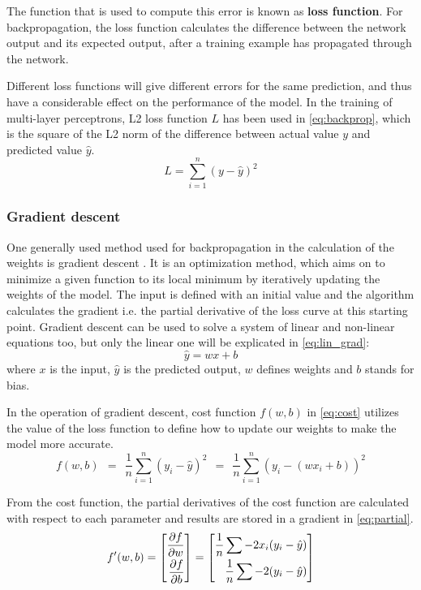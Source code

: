 The function that is used to compute this error is known as \textbf{loss function}. For backpropagation, the loss function calculates the difference between the network output and its expected output, after a training example has propagated through the network. \medskip

Different loss functions will give different errors for the same prediction, and thus have a considerable effect on the performance of the model. In the training of multi-layer perceptrons, L2 loss function $L$ has been used in \eqref{eq:backprop}, which is the square of the L2 norm of the difference between actual value $y$ and predicted value $\hat{y}$.
\begin{equation} L = \sum^n_{i=1}(y - \hat{y})^2 \label{eq:backprop} \end{equation}



\subsubsection{Gradient descent}

One generally used method used for backpropagation in the calculation of the weights is gradient descent \cite{anderson1995introduction}. It is an optimization method, which aims on to minimize a given function to its local minimum by iteratively updating the weights of the model. The input is defined with an initial value and the algorithm calculates the gradient i.e. the partial derivative of the loss curve at this starting point. Gradient descent can be used to solve a system of linear and non-linear equations too, but only the linear one will be explicated in \eqref{eq:lin_grad}:
\begin{equation} \hat{y} = wx + b \label{eq:lin_grad} \end{equation}
where $x$ is the input, $\hat{y}$ is the predicted output, $w$ defines weights and $b$ stands for bias.\medskip

In the operation of gradient descent, cost function $f(w,b)$ in \eqref{eq:cost} utilizes the value of the loss function to define how to update our weights to make the model more accurate.
\begin{equation} f(w,b) ~~=~~ \frac{1}{n} \sum_{i=1}^n(y_i-\hat{y})^2 ~~=~~ \frac{1}{n} \sum_{i=1}^n(y_i-(wx_i+b))^2 \label{eq:cost} \end{equation}

From the cost function, the partial derivatives of the cost function are calculated with respect to each parameter and results are stored in a gradient in \eqref{eq:partial}.
\begin{equation} f'(w,b) = \bmatrix{ \aligned \frac{\partial f}{\partial w} \\
	\frac{\partial f}{\partial b} \endaligned }\endbmatrix
= \bmatrix{ \aligned \frac{1}{n} \sum - 2x_i(y_i-\hat{y}) \\
	\frac{1}{n} \sum - 2(y_i-\hat{y}) \endaligned }\endbmatrix \label{eq:partial} \end{equation}

